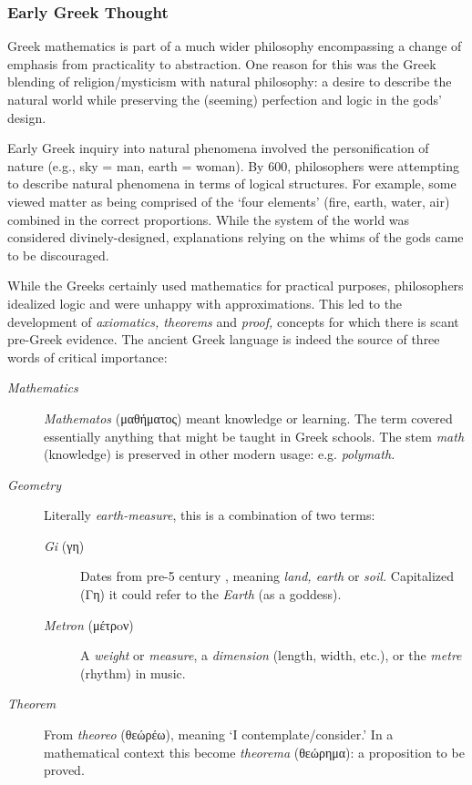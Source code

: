 \subsubsection*{Early Greek Thought}

Greek mathematics is part of a much wider philosophy encompassing a change of emphasis from practicality to abstraction. One reason for this was the Greek blending of religion/mysticism with natural philosophy: a desire to describe the natural world while preserving the (seeming) perfection and logic in the gods' design.\smallbreak

Early Greek inquiry into natural phenomena involved the personification of nature (e.g., sky = man, earth = woman). By 600\BC, philosophers were attempting to describe natural phenomena in terms of logical structures. For example, some viewed matter as being comprised of the `four elements' (fire, earth, water, air) combined in the correct proportions. While the system of the world was considered divinely-designed, explanations relying on the whims of the gods came to be discouraged.\smallbreak

While the Greeks certainly used mathematics for practical purposes, philosophers idealized logic and were unhappy with approximations. This led to the development of \emph{axiomatics, theorems} and \emph{proof,} concepts for which there is scant pre-Greek evidence. The ancient Greek language is indeed the source of three words of critical importance:
\begin{description}
	\item[\emph{Mathematics}] \emph{Mathematos} (μαθήματος) meant knowledge or learning. The term covered essentially anything that might be taught in Greek schools. The stem \emph{math} (knowledge) is preserved in other modern usage: e.g. \emph{polymath.}
	\item[\emph{Geometry}] Literally \emph{earth-measure}, this is a combination of two terms:
	\begin{description}
		\item[\normalfont\emph{Gi} (γη)] Dates from pre-5\th{} century \!\BC{}, meaning \emph{land, earth} or \emph{soil.} Capitalized (Γη) it could refer to the \emph{Earth} (as a goddess).
		\item[\normalfont\emph{Metron} (μέτρoν)] A \emph{weight} or \emph{measure}, a \emph{dimension}  (length, width, etc.), or the \emph{metre} (rhythm) in music.
		\end{description}
	\item[\emph{Theorem}] From \emph{theoreo} (θεώρέω), meaning `I contemplate/consider.' In a mathematical context this become \emph{theorema} (θεώρημα): a proposition to be proved.
\end{description}


